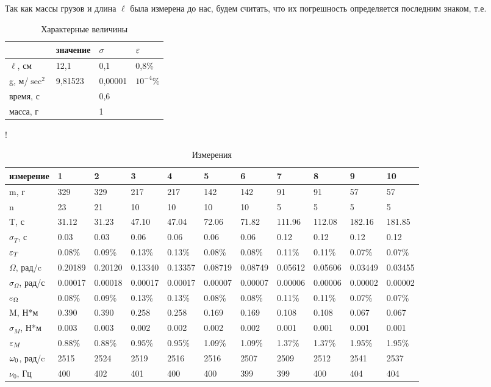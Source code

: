 \documentclass[a4paper,12pt]{article} %
\begin{document}
\begin{enumerate}
Так как массы грузов и длина $\ell$ была измерена до нас, будем считать, что их погрешность определяется последним знаком, т.е.

\begin{table} [h] \center
\begin{tabular}{l|l|l|l}
&значение&$\sigma$&$\varepsilon$\\
\hline
$\ell$, см&12,1&0,1&0,8\%\\
g, м/$\sec^2$&9,81523&0,00001&$10^{-4}$\%\\
время, с&&0,6&\\
масса, г&&1&\\
\end{tabular}
\caption[Таблица 1]{Характерные величины \label{table:1}}
\end{table}


\begin{table} [h]
\resizebox {\textwidth} {!} {
\begin{tabular} {l|llllllllll}
измерение&1&2&3&4&5&6&7&8&9&10\\
\hline
m, г&329&329&217&217&142&142&91&91&57&57\\
n&23&21&10&10&10&10&5&5&5&5\\
T, с&31.12&31.23&47.10&47.04&72.06&71.82&111.96&112.08&182.16&181.85\\
$\sigma_{T}$, с&0.03&0.03&0.06&0.06&0.06&0.06&0.12&0.12&0.12&0.12\\
$\varepsilon_{T}$&0.08\%&0.09\%&0.13\%&0.13\%&0.08\%&0.08\%&0.11\%&0.11\%&0.07\%&0.07\%\\
$\Omega$, рад/c&0.20189&0.20120&0.13340&0.13357&0.08719&0.08749&0.05612&0.05606&0.03449&0.03455\\
$\sigma_{\Omega}$, рад/с&0.00017&0.00018&0.00017&0.00017&0.00007&0.00007&0.00006&0.00006&0.00002&0.00002\\
$\varepsilon_{\Omega}$&0.08\%&0.09\%&0.13\%&0.13\%&0.08\%&0.08\%&0.11\%&0.11\%&0.07\%&0.07\%\\
M, Н*м&0.390&0.390&0.258&0.258&0.169&0.169&0.108&0.108&0.067&0.067\\
$\sigma_{M}$, Н*м&0.003&0.003&0.002&0.002&0.002&0.002&0.001&0.001&0.001&0.001\\
$\varepsilon_{M}$&0.88\%&0.88\%&0.95\%&0.95\%&1.09\%&1.09\%&1.37\%&1.37\%&1.95\%&1.95\%\\
$\omega_0$, рад/c&2515&2524&2519&2516&2516&2507&2509&2512&2541&2537\\
$\nu_0$, Гц&400&402&401&400&400&399&399&400&404&404\\
\end{tabular} 
}
\caption{Измерения \label{table:2}}
\end{table}



\end{enumerate}
\end{document}

